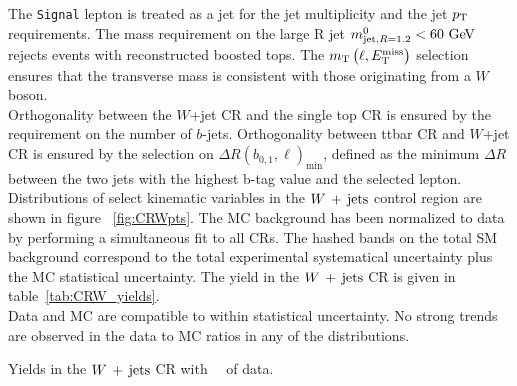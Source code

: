 \indent The {\tt Signal} lepton is treated as a jet for the jet multiplicity and the jet $p_{\mathrm{T}}$ requirements.  The mass requirement on the large R jet $\mantikttwelvezero < 60 \gev$ rejects events with reconstructed boosted tops.  The $m_{\mathrm{T}}\left(\ell,E_{\mathrm{T}}^{\mathrm{miss}}\right)$ selection ensures that the transverse mass is consistent with those originating from a $W$ boson.  \\

\indent Orthogonality between the $W$+jet CR and the single top CR is ensured by the requirement on the number of $b$-jets.  Orthogonality between ttbar CR and $W$+jet CR is ensured by the selection on $\Delta R(b_{0,1},\ell)_{\mathrm{min}}$, defined as the minimum $\Delta R$ between the two jets with the highest b-tag value and the selected lepton.  \\

\indent  Distributions of select kinematic variables in the $W\,+\,\mathrm{jets}$ control region are shown in figure ~\ref{fig:CRWpts}.  The MC background has been normalized to data by performing a simultaneous fit to all CRs.  The hashed bands on the total SM background correspond to the total experimental systematical uncertainty plus the MC statistical uncertainty.  The yield in the $W\,+\,\mathrm{jets}$ CR is given in table~\ref{tab:CRW_yields}.  \\

\indent  Data and MC are compatible to within statistical uncertainty.  No strong trends are observed in the data to MC ratios in any of the distributions. \\

\begin{table}[!htb]
  \centering
  
  \caption{Yields in the $W\,+\,\mathrm{jets}$ CR with \intlumi\ \ifb\ of data.  }
  \label{tab:CRW_yields}
\end{table}

